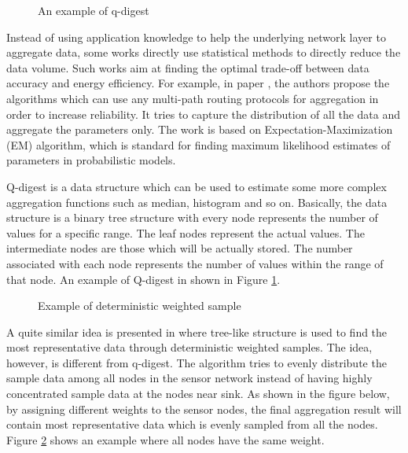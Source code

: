 \begin{figure}
\centering
{}
\caption{An example of q-digest}
\label{fig:qdigest}
\end{figure}

Instead of using application knowledge to help the underlying network layer to aggregate data, some works directly use statistical methods to directly reduce the data volume. Such works aim at finding the optimal trade-off between data accuracy and energy efficiency. For example, in paper \cite{jiang:statistical}, the authors propose the algorithms which can use any multi-path routing protocols for aggregation in order to increase reliability. It tries to capture the distribution of all the data and aggregate the parameters only. The work is based on Expectation-Maximization (EM) algorithm, which is standard for finding maximum likelihood estimates of parameters in probabilistic models.

Q-digest \cite{qdigest} is a data structure which can be used to estimate some more complex aggregation functions such as median, histogram and so on. Basically, the data structure is a binary tree structure with every node represents the number of values for a specific range. The leaf nodes represent the actual values. The intermediate nodes are those which will be actually stored. The number associated with each node represents the number of values within the range of that node. An example of Q-digest in shown in Figure \ref{fig:qdigest}.

\begin{figure}
\centering
{}
\caption{Example of deterministic weighted sample}
\label{fig:deterministic}
\end{figure}

A quite similar idea is presented in \cite{akca:deterministic} where tree-like structure is used to find the most representative data through deterministic weighted samples. The idea, however, is different from q-digest. The algorithm tries to evenly distribute the sample data among all nodes in the sensor network instead of having highly concentrated sample data at the nodes near sink. As shown in the figure below, by assigning different weights to the sensor nodes, the final aggregation result will contain most representative data which is evenly sampled from all the nodes. Figure \ref{fig:deterministic} shows an example where all nodes have the same weight.

